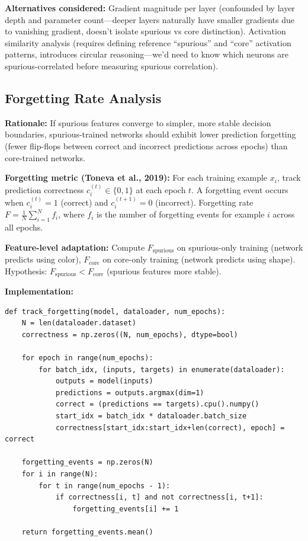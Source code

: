 \textbf{Alternatives considered:} Gradient magnitude per layer (confounded by layer depth and parameter count---deeper layers naturally have smaller gradients due to vanishing gradient, doesn't isolate spurious vs core distinction). Activation similarity analysis (requires defining reference ``spurious'' and ``core'' activation patterns, introduces circular reasoning---we'd need to know which neurons are spurious-correlated before measuring spurious correlation).

\subsection{Forgetting Rate Analysis}

\textbf{Rationale:} If spurious features converge to simpler, more stable decision boundaries, spurious-trained networks should exhibit lower prediction forgetting (fewer flip-flops between correct and incorrect predictions across epochs) than core-trained networks.

\textbf{Forgetting metric (Toneva et al., 2019):} For each training example $x_i$, track prediction correctness $c_i^{(t)} \in \{0, 1\}$ at each epoch $t$. A forgetting event occurs when $c_i^{(t)} = 1$ (correct) and $c_i^{(t+1)} = 0$ (incorrect). Forgetting rate $F = \frac{1}{N} \sum_{i=1}^N f_i$, where $f_i$ is the number of forgetting events for example $i$ across all epochs.

\textbf{Feature-level adaptation:} Compute $F_{\text{spurious}}$ on spurious-only training (network predicts using color), $F_{\text{core}}$ on core-only training (network predicts using shape). Hypothesis: $F_{\text{spurious}} < F_{\text{core}}$ (spurious features more stable).

\textbf{Implementation:}
\begin{verbatim}
def track_forgetting(model, dataloader, num_epochs):
    N = len(dataloader.dataset)
    correctness = np.zeros((N, num_epochs), dtype=bool)

    for epoch in range(num_epochs):
        for batch_idx, (inputs, targets) in enumerate(dataloader):
            outputs = model(inputs)
            predictions = outputs.argmax(dim=1)
            correct = (predictions == targets).cpu().numpy()
            start_idx = batch_idx * dataloader.batch_size
            correctness[start_idx:start_idx+len(correct), epoch] = correct

    forgetting_events = np.zeros(N)
    for i in range(N):
        for t in range(num_epochs - 1):
            if correctness[i, t] and not correctness[i, t+1]:
                forgetting_events[i] += 1

    return forgetting_events.mean()
\end{verbatim}

